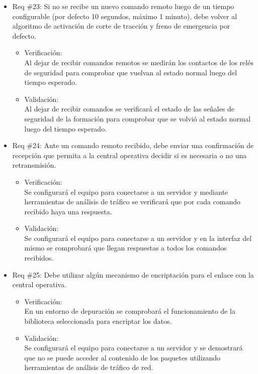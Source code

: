 \documentclass[11pt]{charter}
\begin{document}
\begin{itemize}
\item Req \#23: Si no se recibe un nuevo comando remoto luego de un tiempo configurable (por defecto 10 segundos, máximo 1 minuto), debe volver al algoritmo de activación de corte de tracción y freno de emergencia por defecto.
\begin{itemize}
  \item Verificación:\\
  Al dejar de recibir comandos remotos se medirán los contactos de los relés de seguridad para comprobar que vuelvan al estado normal luego del tiempo esperado.
  \item Validación:\\
  Al dejar de recibir comandos se verificará el estado de las señales de seguridad de la formación para comprobar que se volvió al estado normal luego del tiempo esperado.
\end{itemize}

\newpage

\item Req \#24: Ante un comando remoto recibido, debe enviar una confirmación de recepción que permita a la central operativa decidir si es necesaria o no una retransmisión.
\begin{itemize}
  \item Verificación:\\
  Se configurará el equipo para conectarse a un servidor y mediante herramientas de análisis de tráfico se verificará que por cada comando recibido haya una respuesta.
  \item Validación:\\
  Se configurará el equipo para conectarse a un servidor y en la interfaz del mismo se comprobará que llegan respuestas a todos los comandos recibidos.
\end{itemize}

\item Req \#25: Debe utilizar algún mecanismo de encriptación para el enlace con la central operativa.
\begin{itemize}
  \item Verificación:\\
  En un entorno de depuración se comprobará el funcionamiento de la biblioteca seleccionada para encriptar los datos.
  \item Validación:\\
  Se configurará el equipo para conectarse a un servidor y se demostrará que no se puede acceder al contenido de los paquetes utilizando herramientas de análisis de tráfico de red.
\end{itemize}


\end{itemize}
\end{document}
